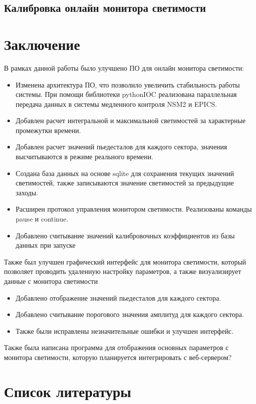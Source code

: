 \documentclass[a4paper, 12pt]{article}
\begin{document}
    \subsection{Калибровка онлайн монитора светимости}
    

\section{Заключение}
    В рамках данной работы было улучшено ПО для онлайн монитора светимости:
    \begin{itemize}
        \item Изменена архитектура ПО, что позволило увеличить стабильность работы системы. При помощи библиотеки pythonIOC реализована параллельная передача данных в системы медленного контроля NSM2 и EPICS.
        \item Добавлен расчет интегральной и максимальной светимостей за характерные промежутки времени.
        \item Добавлен расчет значений пьедесталов для каждого сектора, значения высчитываются в режиме реального времени.
        \item Создана база данных на основе sqlite для сохранения текущих значений светимостей, также записываются значение светимостей за предыдущие заходы.
        \item Расширен протокол управления монитором светимости. Реализованы команды pause и continue.
        \item Добавлено считывание значений калибровочных коэффициентов из базы данных при запуске
    \end{itemize}
    
    Также был улучшен графический интерфейс для монитора светимости, который позволяет проводить удаленную настройку параметров, а также визуализирует данные с монитора светимости
    \begin{itemize} 
        \item Добавлено отображение значений пьедесталов для каждого сектора.
        \item Добавлено считывание порогового значения амплитуд для каждого сектора.
        \item Также были исправлены незначительные ошибки и улучшен интерфейс.
    \end{itemize}
    
    Также была написана программа для отображения основных параметров с монитора светимости, которую планируется интегрировать с веб-сервером?

\section{Список литературы}
\end{document}
